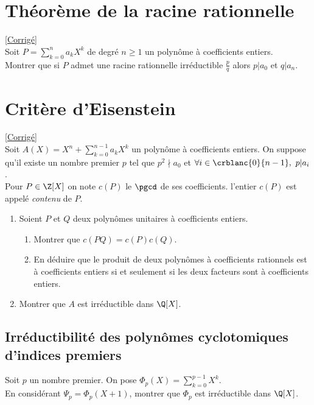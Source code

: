 \documentclass{book}
\begin{document}
	\section{Théorème de la racine rationnelle }
	\textcolor{blue}{\hyperref[sec:theoreme-de-la-racine-rationnelle]{[Corrigé]}}\\
	\label{Théorème de la racine rationnelle}
	Soit $P=\displaystyle\sum_{k=0}^na_kX^k$ de degré $n\geq 1$ un polynôme à coefficients entiers.\\
	Montrer que si $P$ admet une racine rationnelle irréductible $\displaystyle\frac{p}{q}$ alors $p|a_0$ et $q|a_n$.
	
	\section{Critère d'Eisenstein }
	\textcolor{blue}{\hyperref[sec:critere-deisenstein-etoile3]{[Corrigé]}}\\
	\label{Eisenstein}
	\label{Critère d'Eisenstein}
	Soit $A(X)=X^n+\displaystyle\sum_{k=0}^{n-1}a_kX^k$ un polynôme à coefficients entiers. On suppose qu'il existe un nombre premier $p$ tel que $p^2\nmid a_0$ et $\forall i\in \crblanc{0}{n-1},\ p|a_i$.\\
	Pour $P\in \Z[X]$ on note $c(P)$ le $\pgcd$ de ses coefficients. l'entier $c(P)$ est appelé \textit{contenu} de $P$.
	\begin{enumerate}
		\item Soient $P$ et $Q$ deux polynômes unitaires à coefficients entiers.
		\begin{enumerate}[label=\alph*.]
			\item Montrer que $c(PQ)=c(P)c(Q)$.
			\item En déduire que le produit de deux polynômes à coefficients rationnels est à coefficients entiers si et seulement si les deux facteurs sont à coefficients entiers.
		\end{enumerate}
		\item Montrer que $A$ est irréductible dans $\Q[X]$.
	\end{enumerate}
	
	\subsection{Irréductibilité des polynômes cyclotomiques d'indices premiers }
	Soit $p$ un nombre premier. On pose $\Phi_p(X)=\displaystyle\sum_{k=0}^{p-1}X^k$.\\
	En considérant $\Psi_p=\Phi_p(X+1)$, montrer que $\Phi_p$ est irréductible dans $\Q[X]$.
	
\end{document}
